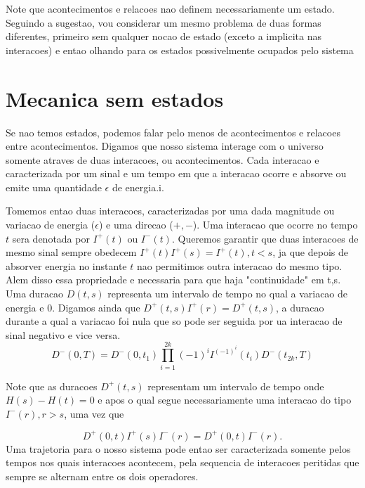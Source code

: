 \documentclass{article}
\begin{document}
Note que acontecimentos e relacoes nao definem necessariamente um estado.
Seguindo a sugestao, vou considerar um mesmo problema de duas formas diferentes,
primeiro sem qualquer nocao de estado (exceto a implicita nas interacoes) e
entao olhando para os estados possivelmente ocupados pelo sistema


\section{Mecanica sem estados}

Se nao temos estados, podemos falar pelo menos de acontecimentos e relacoes
entre acontecimentos. Digamos que nosso sistema interage com o universo somente
atraves de duas interacoes, ou acontecimentos. Cada interacao e caracterizada
por um sinal e um tempo em que a interacao ocorre e absorve ou emite uma
quantidade $\epsilon$ de energia.i.



Tomemos entao duas interacoes,
caracterizadas por uma dada magnitude ou variacao de energia ($\epsilon$) e uma
direcao ($+,-$). 
Uma interacao que ocorre no tempo $t$ sera denotada por $I^+(t)$ ou $I^-(t)$.
Queremos garantir que duas interacoes de mesmo sinal sempre obedecem $I^+(t)
I^+(s) = I^+(t), t<s$, ja que depois de absorver energia no instante $t$ nao
permitimos outra interacao do mesmo tipo. Alem disso essa propriedade e
necessaria para que haja "continuidade" em t,s.\\

Uma duracao $D(t,s)$ representa um intervalo de tempo no qual a variacao de
energia e 0. Digamos ainda que $D^+(t,s)I^+(r) = D^+(t,s)$, a duracao
durante a qual a variacao foi nula que so pode ser seguida por ua interacao de
sinal negativo e vice versa.\\

$$
D^-(0,T) = D^-(0,t_1) \prod_{i=1}^{2k} (-1)^i I^{(-1)^i}(t_i) D^-(t_{2k}, T)
$$

Note que as duracoes $D^+(t,s)$ representam um intervalo de tempo onde 
$H(s)-H(t) = 0$ e apos o qual segue necessariamente uma interacao do tipo
$I^-(r), r > s$, uma vez que

$$
D^+(0,t)I^+(s)I^-(r) = D^+(0,t) I^-(r).
$$
Uma trajetoria para o nosso sistema pode entao ser caracterizada somente pelos
tempos nos quais interacoes acontecem, pela sequencia de interacoes peritidas
que sempre se alternam entre os dois operadores.
\end{document}
